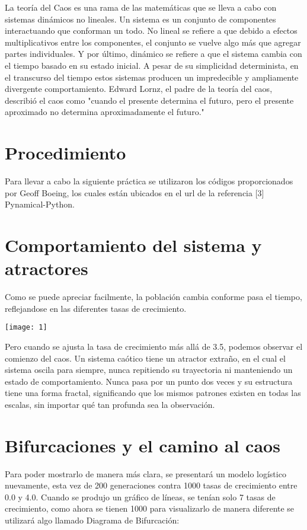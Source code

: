 \documentclass[12pt]{article}
\begin{document}
La teoría del Caos es una rama de las matemáticas que se lleva a cabo con sistemas dinámicos no lineales. Un sistema es un conjunto de componentes interactuando que conforman un todo. No lineal se refiere a que debido a efectos multiplicativos entre los componentes, el conjunto se vuelve algo más que agregar partes individuales. Y por último, dinámico se refiere a que el sistema cambia con el tiempo basado en su estado inicial. A pesar de su simplicidad determinista, en el transcurso del tiempo estos sistemas producen un impredecible y ampliamente divergente comportamiento. Edward Lornz, el padre de la teoría del caos, describió el caos como "cuando el presente determina el futuro, pero el presente aproximado no determina aproximadamente el futuro."

\newpage
\section*{Procedimiento}
Para llevar a cabo la siguiente práctica se utilizaron los códigos proporcionados por Geoff Boeing, los cuales están ubicados en el url de la referencia [3] Pynamical-Python.


\section*{Comportamiento del sistema y atractores}
Como se puede apreciar facilmente, la población cambia conforme pasa el tiempo, reflejandose en las diferentes tasas de crecimiento.\\

\begin{center}
\texttt{[image: 1]}
\end{center}

Pero cuando se ajusta la tasa de crecimiento más allá de 3.5, podemos observar el comienzo del caos. Un sistema caótico tiene un atractor extraño, en el cual el sistema oscila para siempre, nunca repitiendo su trayectoria ni manteniendo un estado de comportamiento. Nunca pasa por un punto dos veces y su estructura tiene una forma fractal, significando que los mismos patrones existen en todas las escalas, sin importar qué tan profunda sea la observación.

\newpage
\section*{Bifurcaciones y el camino al caos}

Para poder mostrarlo de manera más clara, se presentará un modelo logístico nuevamente, esta vez de 200 generaciones contra 1000 tasas de crecimiento entre 0.0 y 4.0. Cuando se produjo un gráfico de líneas, se tenían solo 7 tasas de crecimiento, como ahora se tienen 1000 para visualizarlo de manera diferente se utilizará algo llamado Diagrama de Bifurcación:
\end{document}
